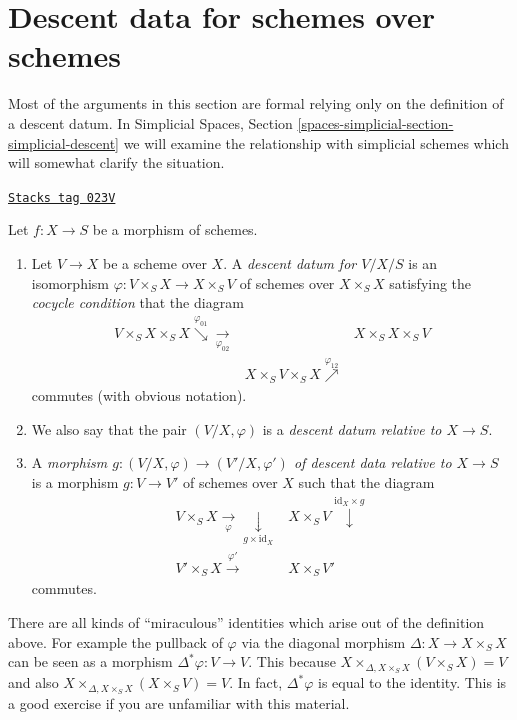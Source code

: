 \section{Descent data for schemes over schemes}
\label{descent-section-descent-datum}
Most of the arguments in this section are formal relying only
on the definition of a descent datum. In
Simplicial Spaces, Section \ref{spaces-simplicial-section-simplicial-descent}
we will examine the relationship with simplicial schemes which will
somewhat clarify the situation.

\begin{definition}
\label{descent-definition-descent-datum}
\href{https://stacks.math.columbia.edu/tag/023V}{\texttt{Stacks tag 023V}}

Let $f : X \to S$ be a morphism of schemes.
\begin{enumerate}
\item Let $V \to X$ be a scheme over $X$.
A {\it descent datum for $V/X/S$} is an isomorphism
$\varphi : V \times_S X \to X \times_S V$ of schemes over
$X \times_S X$ satisfying the {\it cocycle condition}
that the diagram
$$
\begin{array}{ccc}V \times_S X \times_S X \overset{\varphi_{01}}{\searrow}\underset{\varphi_{02}}{\longrightarrow} &  & X \times_S X \times_S V \\  & X \times_S V \times_S X \overset{\varphi_{12}}{\nearrow} & \end{array}
$$
commutes (with obvious notation).
\item We also say that the pair $(V/X, \varphi)$ is
a {\it descent datum relative to $X \to S$}.
\item A {\it morphism $g : (V/X, \varphi) \to (V'/X, \varphi')$ of
descent data relative to $X \to S$} is a morphism
$g : V \to V'$ of schemes over $X$ such that
the diagram
$$
\begin{array}{cc}V \times_S X \underset{\varphi}{\longrightarrow}\underset{g \times \text{id}_X}{\downarrow} & X \times_S V \overset{\text{id}_X \times g}{\downarrow} \\ V' \times_S X \overset{\varphi'}{\longrightarrow} & X \times_S V'\end{array}
$$
commutes.
\end{enumerate}
\end{definition}

There are all kinds of ``miraculous'' identities which arise out of the
definition above. For example the pullback of $\varphi$ via the diagonal
morphism $\Delta : X \to X \times_S X$ can be seen as a morphism
$\Delta^*\varphi : V \to V$.
This because $X \times_{\Delta, X \times_S X} (V \times_S X) = V$
and also $X \times_{\Delta, X \times_S X} (X \times_S V) = V$.
In fact, $\Delta^*\varphi$ is equal to the identity.
This is a good exercise if you are unfamiliar with this material.

